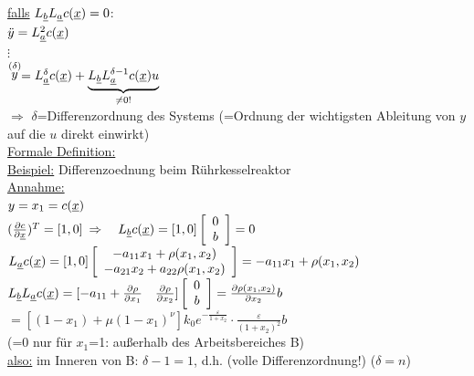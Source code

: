 \documentclass[openany,a4paper,11pt]{book}
\begin{document}
\uline{falls} $L_{\uline{b}}L_{\uline{a}}c(\uline{x})=0$:\\
$\ddot{y}=L_{\uline{a}}^2 c(\uline{x})$\\
$\vdots$\\
$\stackrel{(\delta)}{y}=L_{\uline{a}}^{\delta} c(\uline{x})+\underbrace{L_{\uline{b}}L_{\uline{a}}^{\delta-1}c(\uline{x})u}_{\ne 0!}$\\
$\Rightarrow$ $\delta$=Differenzordnung des Systems (=Ordnung der wichtigsten Ableitung von $y$ auf die $u$ direkt einwirkt)\\
\uline{Formale Definition:} \\
\uline{Beispiel:} Differenzoednung beim Rührkesselreaktor \\
\uline{Annahme:} \\
$y=x_1=c(\uline{x})$\\
$(\frac{\partial c}{\partial \uline{x}})^T=[1,0]$ $\Rightarrow \quad L_{\uline{b}}c(\uline{x})=[1,0] \left[\begin{array}{c} 0\\ b\\ \end{array} \right]  =0$\\
$L_{\uline{a}}c(\uline{x})=[1,0]\left[\begin{array}{cc} -a_{11}x_1+\rho(x_1,x_2)\\ -a_{21}x_2+a_{22}\rho(x_1,x_2)\\ \end{array} \right]=-a_{11}x_1+\rho(x_1,x_2)$\\
$L_{\uline{b}}L_{\uline{a}}c(\uline{x})=[-a_{11}+\frac{\partial \rho}{\partial x_1} \quad \frac{\partial \rho}{\partial x_2}]\left[\begin{array}{c} 0\\ b\\ \end{array} \right] =\frac{\partial \rho(x_1,x_2)}{\partial x_2}b$\\ $=[(1-x_1)+\mu(1-x_1)^{\nu}]k_0e^{-\frac{\varepsilon}{1+x_2}}\cdot \frac{\varepsilon}{(1+x_2)^2}b$\\
(=0 nur für $x_1$=1: außerhalb des Arbeitsbereiches B)\\
\uline{also:} im Inneren von B: $\delta-1=1$, d.h.  (volle Differenzordnung!) ($\delta=n$)
\end{document}
